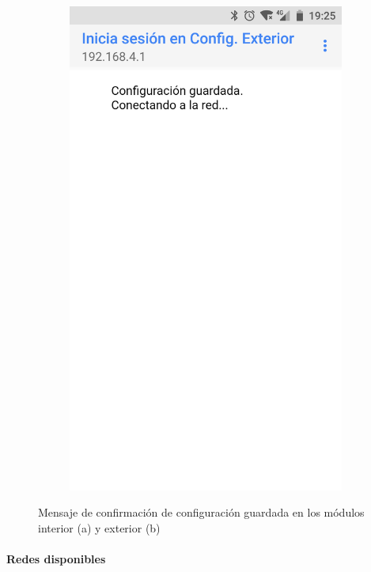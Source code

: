 \begin{figure}
\begin{subfigure}{0.49\columnwidth}
  \includegraphics[width=1\columnwidth,frame]{images/exterior-config-saved}
  \caption{}
  \label{fig:exterior-config-saved}
\end{subfigure}
\caption{Mensaje de confirmación de configuración guardada en los módulos interior (a) y exterior (b)}
\label{fig:config-saved}
\end{figure}


\paragraph{Redes disponibles}


